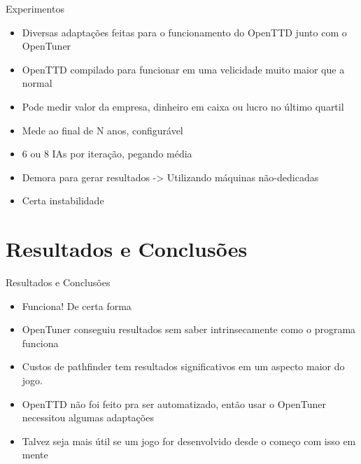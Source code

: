 \documentclass[10pt]{beamer}
\begin{document}
\begin{frame}{Experimentos}
	\begin{itemize}
	\item Diversas adaptações feitas para o funcionamento do OpenTTD junto com o OpenTuner \pause\\
	\item OpenTTD compilado para funcionar em uma velicidade muito maior que a normal\pause\\
	\item Pode medir valor da empresa, dinheiro em caixa ou lucro no último quartil\pause\\
	\item Mede ao final de N anos, configurável\pause\\
	\item 6 ou 8 IAs por iteração, pegando média\pause\\
	\item Demora para gerar resultados \pause -> Utilizando máquinas não-dedicadas\pause\\
	\item Certa instabilidade
	\end{itemize}
\end{frame}

\section{Resultados e Conclusões}

\begin{frame}{Resultados e Conclusões}
	\begin{itemize}
	\item Funciona! \pause De certa forma\pause\\
	\item OpenTuner conseguiu resultados sem saber intrinsecamente como o programa funciona\pause \\
	\item Custos de pathfinder tem resultados significativos em um aspecto maior do jogo.\pause\\
	\item OpenTTD não foi feito pra ser automatizado, então usar o OpenTuner necessitou algumas adaptações\pause\\
	\item Talvez seja mais útil se um jogo for desenvolvido desde o começo com isso em mente
	\end{itemize}
\end{frame}
\end{document}
